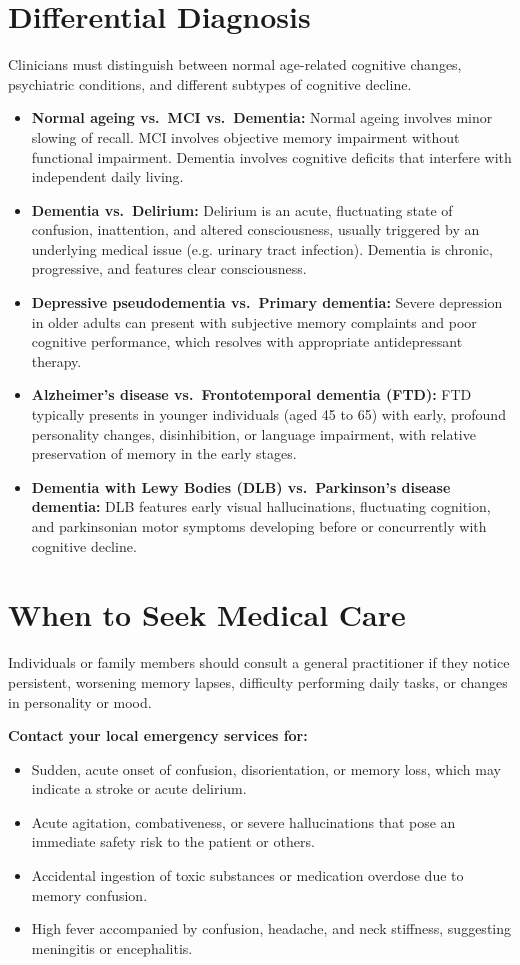 \section*{Differential Diagnosis}
Clinicians must distinguish between normal age-related cognitive changes, psychiatric conditions, and different subtypes of cognitive decline.
\begin{itemize}
    \item \textbf{Normal ageing vs.\ MCI vs.\ Dementia:} Normal ageing involves minor slowing of recall. MCI involves objective memory impairment without functional impairment. Dementia involves cognitive deficits that interfere with independent daily living.
    \item \textbf{Dementia vs.\ Delirium:} Delirium is an acute, fluctuating state of confusion, inattention, and altered consciousness, usually triggered by an underlying medical issue (e.g. urinary tract infection). Dementia is chronic, progressive, and features clear consciousness.
    \item \textbf{Depressive pseudodementia vs.\ Primary dementia:} Severe depression in older adults can present with subjective memory complaints and poor cognitive performance, which resolves with appropriate antidepressant therapy.
    \item \textbf{Alzheimer's disease vs.\ Frontotemporal dementia (FTD):} FTD typically presents in younger individuals (aged 45 to 65) with early, profound personality changes, disinhibition, or language impairment, with relative preservation of memory in the early stages.
    \item \textbf{Dementia with Lewy Bodies (DLB) vs.\ Parkinson's disease dementia:} DLB features early visual hallucinations, fluctuating cognition, and parkinsonian motor symptoms developing before or concurrently with cognitive decline.
\end{itemize}

\section*{When to Seek Medical Care}
Individuals or family members should consult a general practitioner if they notice persistent, worsening memory lapses, difficulty performing daily tasks, or changes in personality or mood.

\textbf{Contact your local emergency services for:}
\begin{itemize}
    \item Sudden, acute onset of confusion, disorientation, or memory loss, which may indicate a stroke or acute delirium.
    \item Acute agitation, combativeness, or severe hallucinations that pose an immediate safety risk to the patient or others.
    \item Accidental ingestion of toxic substances or medication overdose due to memory confusion.
    \item High fever accompanied by confusion, headache, and neck stiffness, suggesting meningitis or encephalitis.
\end{itemize}

